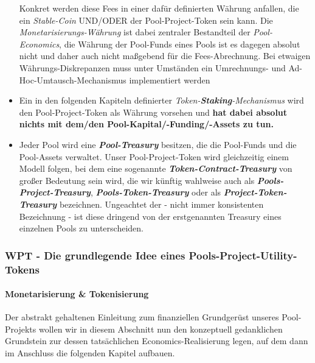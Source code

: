 \begin{Abgrenzung}
\begin{itemize}
	Konkret werden diese Fees in einer dafür definierten Währung anfallen, die ein \textit{Stable-Coin} UND/ODER der Pool-Project-Token sein kann. Die \textit{Monetarisier\-ungs-Währung} ist dabei zentraler Bestandteil der \textit{Pool-Economics}, die Währung der Pool-Funds eines Pools ist es dagegen absolut nicht und daher auch nicht maßgebend für die Fees-Abrechnung. Bei etwaigen Währungs-Diskrepanzen muss unter Umständen ein Umrechnungs- und Ad-Hoc-Umtausch-Mechanismus implementiert werden
	\item Ein in den folgenden Kapiteln definierter \textit{Token-\textbf{Staking}-Mechanismus} wird den Pool-Project-Token als Währung vorsehen und \textbf{hat dabei absolut nichts mit dem/den Pool-Kapital/-Funding/-Assets zu tun.}
	\item Jeder Pool wird eine \textbf{\textit{Pool-Treasury}} besitzen, die die Pool-Funds und die Pool-Assets verwaltet. Unser Pool-Project-Token wird gleichzeitig einem Mo\-dell folgen, bei dem eine sogenannte \textbf{\textit{Token-Contract-Treasury}} von großer Bedeutung sein wird, die wir künftig wahlweise auch als \textbf{\textit{Pools-Project-Treasury}}, \textbf{\textit{Pools-Token-Treasury}} oder als \textbf{\textit{Project-Token-Treasury}} be\-zeichnen. Ungeachtet der - nicht immer konsistenten Bezeichnung - ist diese dringend von der erstgenannten Treasury eines einzelnen Pools zu unterscheiden.
\end{itemize}

\end{Abgrenzung}

\vspace{0.5cm}



\subsubsection{WPT - Die grundlegende Idee eines Pools-Project-Utility-Tokens}
\vspace{0.2cm}

\paragraph{Monetarisierung \& Tokenisierung}
\textbf{ }
\vspace{0.3cm}

Der abstrakt gehaltenen Einleitung zum finanziellen Grundgerüst unseres Pool-Projekts wollen wir in diesem Abschnitt nun den konzeptuell gedanklichen Grundstein zur dessen tatsächlichen Economics-Realisierung legen, auf dem dann im Anschluss die folgenden Kapitel aufbauen.

